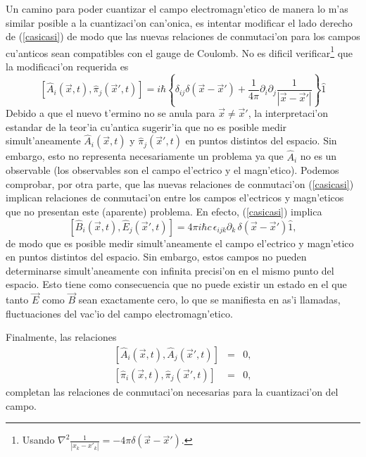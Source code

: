 Un camino para poder cuantizar el campo electromagn'etico de manera lo m'as
similar posible a la cuantizaci'on can'onica, es intentar modificar el lado
derecho de  (\ref{casicasi}) de modo que las nuevas relaciones de conmutaci'on
para los campos cu'anticos sean compatibles con el gauge de Coulomb. No es
dificil verificar\footnote{Usando $\nabla^2\frac{1}{\left| x_{k}-x'_{k}\right|
}=-4\pi\delta (\vec{x}-\vec{x}')$.}  que la modificaci'on requerida es 
\begin{equation}
\left[ \hat{A}_{i}(\vec{x},t) ,\hat{\pi}_{j}(\vec{x}',t) \right] =i\hbar\left\{
\delta_{ij}\delta (\vec{x}-\vec{x}')
+\frac{1}{4\pi}\partial_i\partial_j\frac{1}{\left| \vec{x}-\vec{x}'\right|
}\right\}
\hat{1}\label{Rel Conm Pi, A}
\end{equation}
Debido a que el nuevo t'ermino no se anula para $\vec{x}\neq\vec{x}'$, la
interpretaci'on estandar de la teor'ia cu'antica sugerir'ia que no es posible
medir simult'aneamente $\hat{A}_{i}(\vec{x},t)$ y $\hat{\pi}_{j}(\vec{x}',t)$ en
puntos distintos del espacio. Sin embargo, esto no representa necesariamente un
problema ya que $\hat{A}_{i}$ no es un observable (los observables son el campo
el'ectrico y el magn'etico). Podemos comprobar, por otra parte, que las nuevas
relaciones de conmutaci'on (\ref{casicasi}) implican relaciones de conmutaci'on
entre los campos el'ectricos y magn'eticos que no presentan este (aparente)
problema. En efecto, (\ref{casicasi}) implica
\begin{equation}
\left[\hat{B}_i(\vec{x},t),\hat{E}_j(\vec{x}',t)\right] =4\pi i\hbar
c\,\epsilon_{ijk}\partial_k\,\delta (\vec{x}-\vec{x}') \hat{1},
\end{equation} 
de modo que es posible medir simult'aneamente el campo el'ectrico y magn'etico
en puntos distintos del espacio. Sin embargo, estos campos no pueden
determinarse simult'aneamente con infinita precisi'on en el mismo punto del
espacio. Esto tiene como consecuencia que no puede existir un estado en el que
tanto $\vec{E}$ como $\vec{B}$ sean exactamente cero, lo que se manifiesta en
as'i llamadas, fluctuaciones del vac'io del campo electromagn'etico.

Finalmente, las relaciones 
\begin{eqnarray}
\left[\hat{A}_i(\vec{x},t),\hat{A}_j(\vec{x}',t)\right] &=&0,\\
\left[\hat{\pi}_i(\vec{x},t),\hat{\pi}_j(\vec{x}',t)\right] &=&0,
\end{eqnarray} 
completan las relaciones de conmutaci'on necesarias para la cuantizaci'on del
campo.



